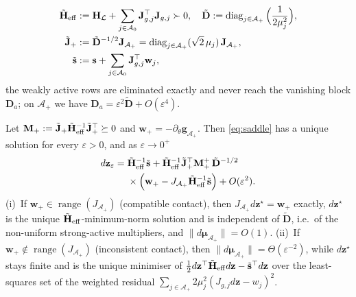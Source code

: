 \begin{equation}
\begin{aligned}
\tilde{\mathbf H}_{\rm eff}&:=\mathbf H_{\mathcal L}+\sum_{j\in\mathcal A_0}\mathbf J_{g,j}^\top\mathbf J_{g,j}\succ0,\quad
\tilde{\mathbf D}:=\operatorname{diag}_{j\in\mathcal A_+}\Big(\frac{1}{2\mu_j^2}\Big),\\
\tilde{\mathbf J}_+&:=\tilde{\mathbf D}^{-1/2}\mathbf J_{\mathcal A_+}=\operatorname{diag}_{j\in\mathcal A_+}(\sqrt2\,\mu_j)\,\mathbf J_{\mathcal A_+},\\
\tilde{\mathbf s}&:=\mathbf s+\sum_{j\in\mathcal A_0}\mathbf J_{g,j}^\top\mathbf w_j,
\end{aligned}
\label{eq:tilde}
\end{equation}
the weakly active rows are eliminated exactly and never reach the vanishing block $\mathbf D_a$; on $\mathcal A_+$ we have $\mathbf D_a=\varepsilon^2\tilde{\mathbf D}+O(\varepsilon^4)$.
\begin{proposition}\label{prop:limit}
Let $\mathbf M_+:=\tilde{\mathbf J}_+\tilde{\mathbf H}_{\rm eff}^{-1}\tilde{\mathbf J}_+^\top\succeq0$ and $\mathbf w_+=-\partial_\theta\mathbf g_{\mathcal A_+}$. Then \eqref{eq:saddle} has a unique solution for every $\varepsilon>0$, and as $\varepsilon\to0^+$
\begin{equation}
\begin{aligned}
d\mathbf z_\varepsilon={}&\tilde{\mathbf H}_{\rm eff}^{-1}\tilde{\mathbf s}
+\tilde{\mathbf H}_{\rm eff}^{-1}\tilde{\mathbf J}_+^\top\mathbf M_+^+\,\tilde{\mathbf D}^{-1/2}\\
&\times\Big(\mathbf w_+-J_{\mathcal A_+}\tilde{\mathbf H}_{\rm eff}^{-1}\tilde{\mathbf s}\Big)+O(\varepsilon^2).
\end{aligned}
\label{eq:limit}
\end{equation}
(i)~If $\mathbf w_+\in\operatorname{range}(J_{\mathcal A_+})$ (compatible contact), then $J_{\mathcal A_+}d\mathbf z^\star=\mathbf w_+$ exactly, $d\mathbf z^\star$ is the unique $\tilde{\mathbf H}_{\rm eff}$-minimum-norm solution and is independent of $\tilde{\mathbf D}$, i.e.\ of the non-uniform strong-active multipliers, and $\|d\boldsymbol\mu_{\mathcal A_+}\|=O(1)$. (ii)~If $\mathbf w_+\notin\operatorname{range}(J_{\mathcal A_+})$ (inconsistent contact), then $\|d\boldsymbol\mu_{\mathcal A_+}\|=\Theta(\varepsilon^{-2})$, while $d\mathbf z^\star$ stays finite and is the unique minimiser of $\frac12d\mathbf z^\top\tilde{\mathbf H}_{\rm eff}d\mathbf z-\tilde{\mathbf s}^\top d\mathbf z$ over the least-squares set of the weighted residual $\sum_{j\in\mathcal A_+}2\mu_j^2(J_{g,j}d\mathbf z-w_j)^2$.
\end{proposition}
